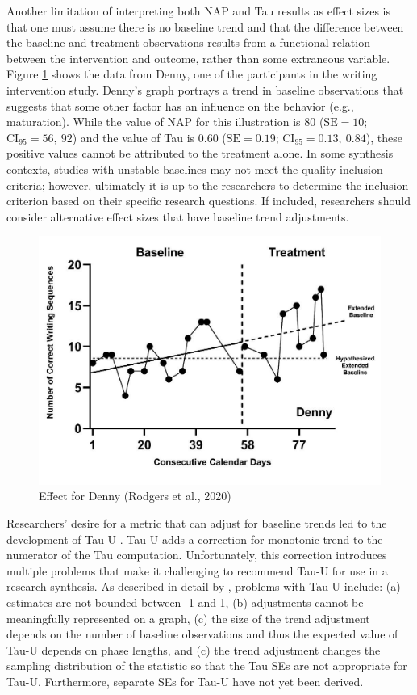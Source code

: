 \documentclass[
]{book}
\begin{document}
Another limitation of interpreting both NAP and Tau results as effect sizes is that one must assume there is no baseline trend and that the difference between the baseline and treatment observations results from a functional relation between the intervention and outcome, rather than some extraneous variable. Figure \ref{fig:Rodgers2020Denny} shows the data from Denny, one of the participants in the \citet{rodgers2021Effects} writing intervention study. Denny's graph portrays a trend in baseline observations that suggests that some other factor has an influence on the behavior (e.g., maturation). While the value of NAP for this illustration is 80 (\(\text{SE} = 10\); \(\text{CI}_{95} = 56,\ 92\)) and the value of Tau is 0.60 (\(\text{SE} = 0.19\); \(\text{CI}_{95} = 0.13,\ 0.84\)), these positive values cannot be attributed to the treatment alone. In some synthesis contexts, studies with unstable baselines may not meet the quality inclusion criteria; however, ultimately it is up to the researchers to determine the inclusion criterion based on their specific research questions. If included, researchers should consider alternative effect sizes that have baseline trend adjustments.

\begin{figure}
\includegraphics[width=1\linewidth]{images/Rodgers-2020-Denny} \caption{Effect for Denny (Rodgers et al., 2020)}\label{fig:Rodgers2020Denny}
\end{figure}

Researchers' desire for a metric that can adjust for baseline trends led to the development of Tau-U \citep{Parker_Vannest_Davis_Sauber_2011}. Tau-U adds a correction for monotonic trend to the numerator of the Tau computation. Unfortunately, this correction introduces multiple problems that make it challenging to recommend Tau-U for use in a research synthesis. As described in detail by \citet{Tarlow_2017}, problems with Tau-U include: (a) estimates are not bounded between -1 and 1, (b) adjustments cannot be meaningfully represented on a graph, (c) the size of the trend adjustment depends on the number of baseline observations and thus the expected value of Tau-U depends on phase lengths, and (c) the trend adjustment changes the sampling distribution of the statistic so that the Tau SEs are not appropriate for Tau-U. Furthermore, separate SEs for Tau-U have not yet been derived.
\end{document}
